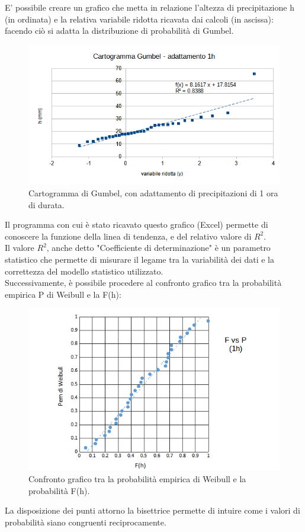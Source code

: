 E' possibile creare un grafico che metta in relazione l'altezza di precipitazione h (in ordinata) e la relativa variabile ridotta ricavata dai calcoli (in ascissa): facendo ciò si adatta la distribuzione di probabilità di Gumbel.
\begin{figure}[H]
    \centering
    \includegraphics[width=0.7 \textwidth]{immagini/cartogramma_gumbel_1h.png}
    \caption{Cartogramma di Gumbel, con adattamento di precipitazioni di 1 ora di durata.}
    \label{fig:cartogramma_gumbel_1h}
\end{figure}
Il programma con cui è stato ricavato questo grafico (Excel) permette di conoscere la funzione della linea di tendenza, e del relativo valore di $R^2$. \\
Il valore $R^2$, anche detto "Coefficiente di determinazione" è un parametro statistico che permette di misurare il legame tra la variabilità dei dati e la correttezza del modello statistico utilizzato. \cite{r_quadro} \\
Successivamente, è possibile procedere al confronto grafico tra la probabilità empirica P di Weibull e la F(h):
\begin{figure}[H]
    \centering
    \includegraphics[width=0.7 \textwidth]{immagini/f_vs_p_1h.png}
    \caption{Confronto grafico tra la probabilità empirica di Weibull e la probabilità F(h).}
    \label{fig:f_vs_p_1h}
\end{figure}
La disposizione dei punti attorno la bisettrice permette di intuire come i valori di probabilità siano congruenti reciprocamente.\\
